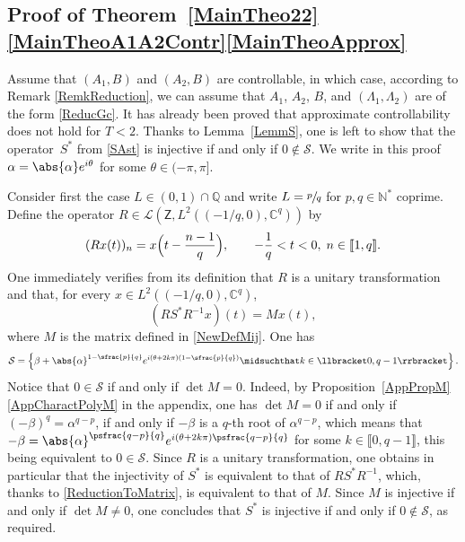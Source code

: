 \subsection{Proof of Theorem~\ref{MainTheo22}\eqref{MainTheoA1A2Contr}\eqref{MainTheoApprox}}

Assume that $(A_1, B)$ and $(A_2, B)$ are controllable, in which case, according to Remark \ref{RemkReduction}, we can assume that $A_1$, $A_2$, $B$, and $(\Lambda_1, \Lambda_2)$ are of the form \eqref{ReducGc}. It has already been proved that approximate controllability does not hold for $T < 2$. Thanks to Lemma~\ref{LemmS}, one is left to show that the operator~$S^\ast$ from \eqref{SAst} is injective if and only if $0 \notin \mathcal S$. We write in this proof $\alpha = \abs{\alpha} e^{i\theta}$ for some $\theta \in (-\pi, \pi]$.

Consider first the case $L \in (0, 1) \cap \mathbb Q$ and write $L = \sfrac{p}{q}$ for $p, q \in \mathbb N^\ast$ coprime. Define the operator $R \in \mathcal L\left(\mathsf Z, L^2\left(\left(-{1}/{q}, 0\right), \mathbb C^q\right)\right)$ by
\[
(R x(t))_n = x\Bigl(t - \frac{n-1}{q}\Bigr), \qquad -\frac{1}{q} < t < 0, \; n \in \llbracket 1, q\rrbracket.
\]
One immediately verifies from its definition that $R$ is a unitary transformation and that, for every $x \in L^2\left(\left(-{1}/{q}, 0\right), \mathbb C^q\right)$,
\begin{equation}
\label{ReductionToMatrix}
(R S^\ast R^{-1} x)(t) = M x(t),
\end{equation}
where $M$ is the matrix defined in \eqref{NewDefMij}. One has
\begin{equation}
\label{CRational}
\mathcal S = \left\{\beta + \abs{\alpha}^{1 - \sfrac{p}{q}} e^{i (\theta + 2 k \pi)\left(1 - \sfrac{p}{q}\right)} \midsuchthat k \in \llbracket 0, q - 1\rrbracket\right\}.
\end{equation}
Notice that $0 \in \mathcal S$ if and only if $\det M = 0$. Indeed, by Proposition~\ref{AppPropM}\eqref{AppCharactPolyM} in the appendix, one has $\det M = 0$ if and only if $(-\beta)^q = \alpha^{q - p}$, \ie if and only if $-\beta$ is a $q$-th root of $\alpha^{q - p}$, which means that $-\beta = \abs{\alpha}^{\psfrac{q - p}{q}} e^{i(\theta + 2 k \pi)\psfrac{q - p}{q}}$ for some $k \in \llbracket 0, q-1\rrbracket$, this being equivalent to $0 \in \mathcal S$. Since $R$ is a unitary transformation, one obtains in particular that the injectivity of $S^\ast$ is equivalent to that of $R S^\ast R^{-1}$, which, thanks to \eqref{ReductionToMatrix}, is equivalent to that of $M$. Since $M$ is injective if and only if $\det M \neq 0$, one concludes that $S^\ast$ is injective if and only if $0 \notin \mathcal S$, as required.

